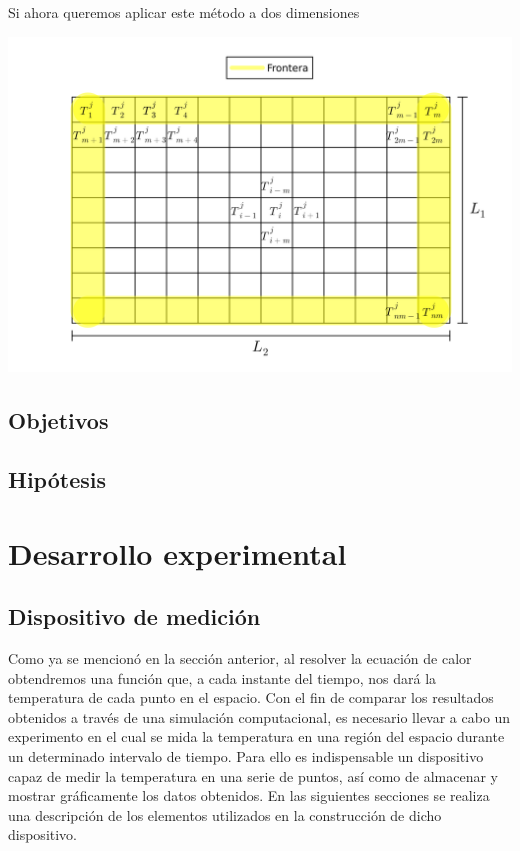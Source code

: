 \documentclass[12pt]{article}
\begin{document}
Si ahora queremos aplicar este método a dos dimensiones 

\begin{center}
    \includegraphics[width=1\linewidth]{Placa.png}
\end{center}

\subsection{Objetivos}
\subsection{Hipótesis}

\section{Desarrollo experimental}

\newpage

\subsection{Dispositivo de medición}

Como ya se mencionó en la sección anterior, al resolver la ecuación de calor obtendremos una función que, a cada instante del tiempo, nos dará la temperatura de cada punto en el espacio. Con el fin de comparar los resultados obtenidos a través de una simulación computacional, es necesario llevar a cabo un experimento en el cual se mida la temperatura en una región del espacio durante un determinado intervalo de tiempo. Para ello es indispensable un dispositivo capaz de medir la temperatura en una serie de puntos, así como de almacenar y mostrar gráficamente los datos obtenidos. En las siguientes secciones se realiza una descripción de los elementos utilizados en la construcción de dicho dispositivo.
\end{document}
